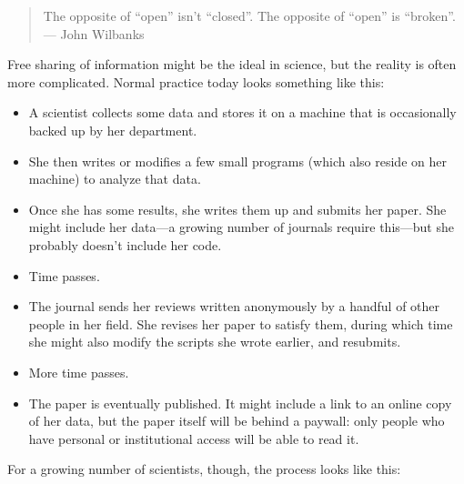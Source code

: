 \documentclass[]{book}
\begin{document}
\begin{quote}
The opposite of ``open'' isn't ``closed''. The opposite of ``open'' is
``broken''. \\
--- John Wilbanks
\end{quote}

Free sharing of information might be the ideal in science, but the
reality is often more complicated. Normal practice today looks something
like this:

\begin{itemize}
\item
  A scientist collects some data and stores it on a machine that is
  occasionally backed up by her department.
\item
  She then writes or modifies a few small programs (which also reside on
  her machine) to analyze that data.
\item
  Once she has some results, she writes them up and submits her paper.
  She might include her data---a growing number of journals require
  this---but she probably doesn't include her code.
\item
  Time passes.
\item
  The journal sends her reviews written anonymously by a handful of
  other people in her field. She revises her paper to satisfy them,
  during which time she might also modify the scripts she wrote earlier,
  and resubmits.
\item
  More time passes.
\item
  The paper is eventually published. It might include a link to an
  online copy of her data, but the paper itself will be behind a
  paywall: only people who have personal or institutional access will be
  able to read it.
\end{itemize}

For a growing number of scientists, though, the process looks like this:
\end{document}

